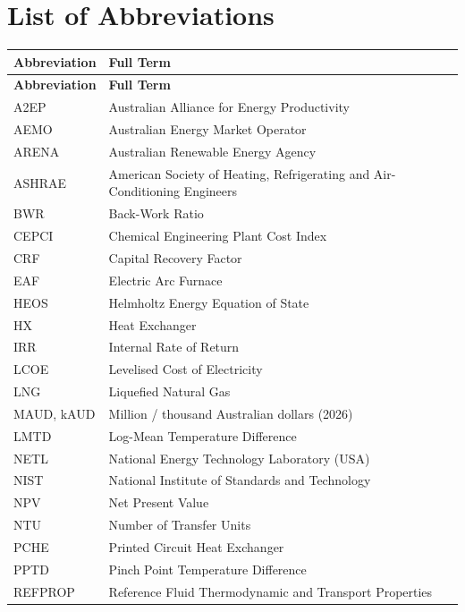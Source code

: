 \chapter*{List of Abbreviations}

\begin{longtable}{p{3.2cm} p{10.5cm}}
\toprule
\textbf{Abbreviation} & \textbf{Full Term} \\
\midrule
\endfirsthead
\toprule
\textbf{Abbreviation} & \textbf{Full Term} \\
\midrule
\endhead
\bottomrule
\endlastfoot
A2EP    & Australian Alliance for Energy Productivity \\
AEMO    & Australian Energy Market Operator \\
ARENA   & Australian Renewable Energy Agency \\
ASHRAE  & American Society of Heating, Refrigerating and Air-Conditioning Engineers \\
BWR     & Back-Work Ratio \\
CEPCI   & Chemical Engineering Plant Cost Index \\
CRF     & Capital Recovery Factor \\
EAF     & Electric Arc Furnace \\
HEOS    & Helmholtz Energy Equation of State \\
HX      & Heat Exchanger \\
IRR     & Internal Rate of Return \\
LCOE    & Levelised Cost of Electricity \\
LNG     & Liquefied Natural Gas \\
MAUD, kAUD & Million / thousand Australian dollars (2026) \\
LMTD    & Log-Mean Temperature Difference \\
NETL    & National Energy Technology Laboratory (USA) \\
NIST    & National Institute of Standards and Technology \\
NPV     & Net Present Value \\
NTU     & Number of Transfer Units \\
PCHE    & Printed Circuit Heat Exchanger \\
PPTD    & Pinch Point Temperature Difference \\
REFPROP & Reference Fluid Thermodynamic and Transport Properties \\

\end{longtable}
